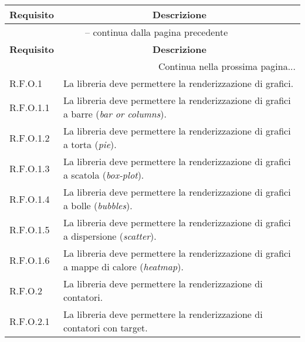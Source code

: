 \begin{center}
    \begin{longtable}{|p{2.5cm}|p{10cm}|}
        \hline
        \rowcolor{gray!30}
        \textbf{Requisito} & \multicolumn{1}{c|}{\textbf{Descrizione}}                                                          \\
        \hline
        \endfirsthead
        \hline
        \multicolumn{2}{|c|}{{\tablename\ \thetable{} -- continua dalla pagina precedente}}                                     \\
        \hline
        \rowcolor{gray!30}
        \textbf{Requisito} & \multicolumn{1}{c|}{\textbf{Descrizione}}                                                          \\
        \endhead
        \hline
        \multicolumn{2}{|r|}{{Continua nella prossima pagina...}}                                                               \\
        \hline
        \endfoot
        \hline
        \endlastfoot
        R.F.O.1            & La libreria deve permettere la renderizzazione di grafici.                                         \\
        \hline
        R.F.O.1.1          & La libreria deve permettere la renderizzazione di grafici a barre (\textit{bar or columns}).       \\
        \hline
        R.F.O.1.2          & La libreria deve permettere la renderizzazione di grafici a torta (\textit{pie}).                  \\
        \hline
        R.F.O.1.3          & La libreria deve permettere la renderizzazione di grafici a scatola (\textit{box-plot}).           \\
        \hline
        R.F.O.1.4          & La libreria deve permettere la renderizzazione di grafici a bolle (\textit{bubbles}).              \\
        \hline
        R.F.O.1.5          & La libreria deve permettere la renderizzazione di grafici a dispersione (\textit{scatter}).        \\
        \hline
        R.F.O.1.6          & La libreria deve permettere la renderizzazione di grafici a mappe di calore (\textit{heatmap}).    \\
        \hline
        R.F.O.2            & La libreria deve permettere la renderizzazione di contatori.                                       \\
        \hline
        R.F.O.2.1          & La libreria deve permettere la renderizzazione di contatori con target.                            \\

\end{longtable}
\end{center}
